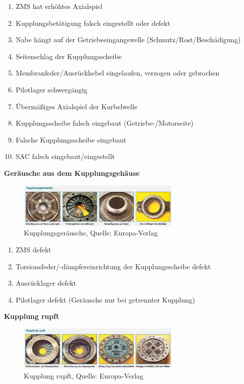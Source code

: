 \begin{enumerate}
\item
  ZMS hat erhöhtes Axialspiel
\item
  Kupplungsbetätigung falsch eingestellt oder defekt
\item
  Nabe hängt auf der Getriebeeingangswelle (Schmutz/Rost/Beschädigung)
\item
  Seitenschlag der Kupplungsscheibe
\item
  Membranfeder/Ausrückhebel eingelaufen, verzogen oder gebrochen
\item
  Pilotlager schwergängig
\item
  Übermäßiges Axialspiel der Kurbelwelle
\item
  Kupplungsscheibe falsch eingebaut (Getriebe-/Motorseite)
\item
  Falsche Kupplungsscheibe eingebaut
\item
  SAC falsch eingebaut/eingestellt
\end{enumerate}

\textbf{Geräusche aus dem Kupplungsgehäuse}

\begin{figure}[!ht]%
\centering
\includegraphics[width=0.7\textwidth]{images/Kupplung/Kupplung-3.pdf}
\caption{Kupplungsgeräusche, Quelle: Europa-Verlag}
\end{figure}

\begin{enumerate}
\item
  ZMS defekt
\item
  Torsionsfeder/-dämpfereinrichtung der Kupplungsscheibe defekt
\item
  Ausrücklager defekt
\item
  Pilotlager defekt (Geräusche nur bei getrennter Kupplung)
\end{enumerate}

\textbf{Kupplung rupft}

\begin{figure}[!ht]%
\centering
\includegraphics[width=0.7\textwidth]{images/Kupplung/Kupplung-2.pdf}
\caption{Kupplung rupft, Quelle: Europa-Verlag}
\end{figure}

